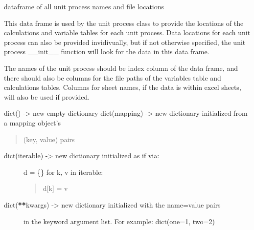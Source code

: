 \documentclass[a4paper,10pt,english]{sphinxmanual}
\begin{document}
\begin{fulllineitems}
\label{\detokenize{unit:unitprocess.df_unit_library}}
dataframe of all unit process names and file locations

This data frame is used by the unit process class to provide the
locations of the calculations and variable tables for each unit
process. Data locations for each unit process can also be provided
invidivually, but if not otherwise specified, the unit process
\_\_init\_\_ function will look for the data in this data frame.

The names of the unit process should be index column of the data
frame, and there should also be columns for the file paths of the
variables table and calculations tables. Columns for sheet names,
if the data is within excel sheets, will also be used if provided.

\end{fulllineitems}


\begin{fulllineitems}
\label{\detokenize{unit:unitprocess.lookup_var_dict}}
dict() -\textgreater{} new empty dictionary
dict(mapping) -\textgreater{} new dictionary initialized from a mapping object’s
\begin{quote}

(key, value) pairs
\end{quote}
\begin{description}
\item[{dict(iterable) -\textgreater{} new dictionary initialized as if via:}] \leavevmode
d = \{\}
for k, v in iterable:
\begin{quote}

d{[}k{]} = v
\end{quote}

\item[{dict({\color{red}\bfseries{}**}kwargs) -\textgreater{} new dictionary initialized with the name=value pairs}] \leavevmode
in the keyword argument list.  For example:  dict(one=1, two=2)

\end{description}

\end{fulllineitems}
\end{document}
